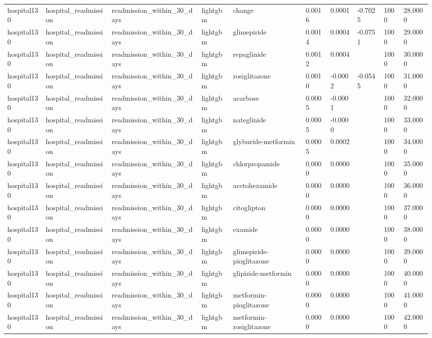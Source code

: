 \begin{tabular}{llllllllll}
hospital130 & hospital\_readmission & readmission\_within\_30\_days & lightgbm & change & 0.0016 & 0.0001 & -0.7025 & 1000 & 28.0000 \\
hospital130 & hospital\_readmission & readmission\_within\_30\_days & lightgbm & glimepiride & 0.0014 & 0.0004 & -0.0751 & 1000 & 29.0000 \\
hospital130 & hospital\_readmission & readmission\_within\_30\_days & lightgbm & repaglinide & 0.0012 & 0.0004 &  & 1000 & 30.0000 \\
hospital130 & hospital\_readmission & readmission\_within\_30\_days & lightgbm & rosiglitazone & 0.0010 & -0.0002 & -0.0545 & 1000 & 31.0000 \\
hospital130 & hospital\_readmission & readmission\_within\_30\_days & lightgbm & acarbose & 0.0005 & -0.0001 &  & 1000 & 32.0000 \\
hospital130 & hospital\_readmission & readmission\_within\_30\_days & lightgbm & nateglinide & 0.0005 & -0.0000 &  & 1000 & 33.0000 \\
hospital130 & hospital\_readmission & readmission\_within\_30\_days & lightgbm & glyburide-metformin & 0.0005 & 0.0002 &  & 1000 & 34.0000 \\
hospital130 & hospital\_readmission & readmission\_within\_30\_days & lightgbm & chlorpropamide & 0.0000 & 0.0000 &  & 1000 & 35.0000 \\
hospital130 & hospital\_readmission & readmission\_within\_30\_days & lightgbm & acetohexamide & 0.0000 & 0.0000 &  & 1000 & 36.0000 \\
hospital130 & hospital\_readmission & readmission\_within\_30\_days & lightgbm & citoglipton & 0.0000 & 0.0000 &  & 1000 & 37.0000 \\
hospital130 & hospital\_readmission & readmission\_within\_30\_days & lightgbm & examide & 0.0000 & 0.0000 &  & 1000 & 38.0000 \\
hospital130 & hospital\_readmission & readmission\_within\_30\_days & lightgbm & glimepiride-pioglitazone & 0.0000 & 0.0000 &  & 1000 & 39.0000 \\
hospital130 & hospital\_readmission & readmission\_within\_30\_days & lightgbm & glipizide-metformin & 0.0000 & 0.0000 &  & 1000 & 40.0000 \\
hospital130 & hospital\_readmission & readmission\_within\_30\_days & lightgbm & metformin-pioglitazone & 0.0000 & 0.0000 &  & 1000 & 41.0000 \\
hospital130 & hospital\_readmission & readmission\_within\_30\_days & lightgbm & metformin-rosiglitazone & 0.0000 & 0.0000 &  & 1000 & 42.0000 \\

\end{tabular}
